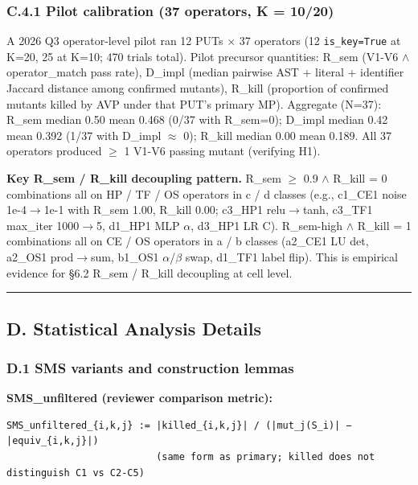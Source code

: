 \documentclass[review,12pt,authoryear]{elsarticle}
\begin{document}
\subsubsection{C.4.1 Pilot calibration (37 operators, K =
10/20)}\label{c.4.1-pilot-calibration-37-operators-k-1020}

A 2026 Q3 operator-level pilot ran 12 PUTs $\times$ 37 operators (12
\texttt{is\_key=True} at K=20, 25 at K=10; 470 trials total). Pilot
precursor quantities: R\_sem (V1-V6 $\wedge$ operator\_match pass rate),
D\_impl (median pairwise AST + literal + identifier Jaccard distance
among confirmed mutants), R\_kill (proportion of confirmed mutants
killed by AVP under that PUT's primary MP). Aggregate (N=37): R\_sem
median 0.50 mean 0.468 (0/37 with R\_sem=0); D\_impl median 0.42 mean
0.392 (1/37 with D\_impl $\approx$ 0); R\_kill median 0.00 mean 0.189. All 37
operators produced $\geq$ 1 V1-V6 passing mutant (verifying H1).

\textbf{Key R\_sem / R\_kill decoupling pattern.} R\_sem $\geq$ 0.9 $\wedge$ R\_kill
= 0 combinations all on HP / TF / OS operators in c / d classes (e.g.,
c1\_CE1 noise 1e-4$\to$1e-1 with R\_sem 1.00, R\_kill 0.00; c3\_HP1
relu$\to$tanh, c3\_TF1 max\_iter 1000$\to$5, d1\_HP1 MLP $\alpha$, d3\_HP1 LR C).
R\_sem-high $\wedge$ R\_kill = 1 combinations all on CE / OS operators in a / b
classes (a2\_CE1 LU det, a2\_OS1 prod$\to$sum, b1\_OS1 $\alpha$/$\beta$ swap, d1\_TF1
label flip). This is empirical evidence for §6.2 R\_sem / R\_kill
decoupling at cell level.

\begin{center}\rule{0.5\linewidth}{0.5pt}\end{center}

\subsection{D. Statistical Analysis
Details}\label{d.-statistical-analysis-details}

\subsubsection{D.1 SMS variants and construction
lemmas}\label{d.1-sms-variants-and-construction-lemmas}

\textbf{SMS\_unfiltered (reviewer comparison metric):}

\begin{verbatim}
SMS_unfiltered_{i,k,j} := |killed_{i,k,j}| / (|mut_j(S_i)| − |equiv_{i,k,j}|)
                          (same form as primary; killed does not distinguish C1 vs C2-C5)
\end{verbatim}
\end{document}
